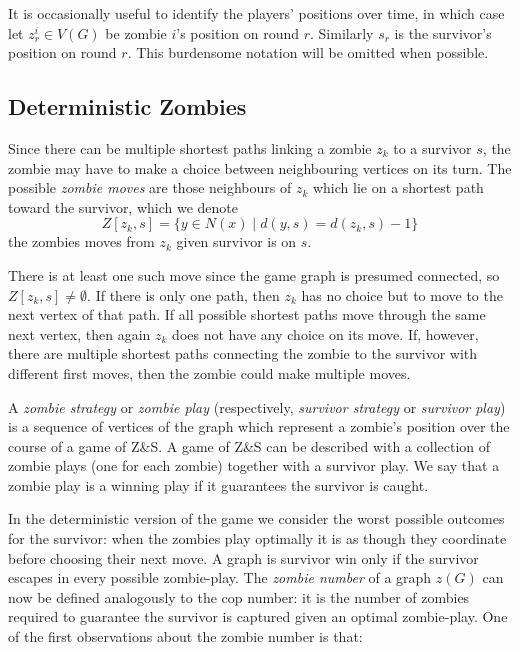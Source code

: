 It is occasionally useful to identify the players' positions over time, in which
case let $z_r^i \in V(G)$ be zombie $i$'s position on round $r$. Similarly $s_r$ is the
survivor's position on round $r$. This burdensome notation will be omitted when possible.

\subsection{Deterministic Zombies}\label{subsection intro deterministic}

Since there can be multiple shortest paths linking a zombie $z_k$ to a survivor $s$, the zombie may have to make a choice between neighbouring vertices on its turn. The possible \textit{zombie moves}
are those neighbours of $z_k$ which lie on a shortest path toward the survivor, which we denote
\[ Z[z_k, s] = \{ y \in N(x) \mid d(y, s) = d(z_k, s) - 1 \} \]
the zombies moves from $z_k$ given survivor is on $s$.

There is at least one such move since the game graph is presumed connected,
so $Z[z_k,s] \neq \emptyset$. If there is only one path, then $z_k$ has no choice but to move to the next vertex of that path. If all possible shortest paths move through the same next vertex, then again $z_k$ does not have any choice on its move. If, however, there are multiple shortest paths connecting the zombie to the survivor with different first moves, then the zombie could make multiple moves.

A \textit{zombie strategy} or \textit{zombie play} (respectively, \textit{survivor strategy} or \textit{survivor play}) is a sequence of vertices of the graph which represent a zombie's position over the course of a game of Z\&S. A game of Z\&S can be described with a collection of zombie plays (one for each zombie) together with a survivor play. We say that a zombie play is a winning play if it guarantees the survivor is caught.

In the deterministic version of the game we consider the worst possible outcomes for the survivor: when the zombies play optimally it is as though they coordinate before choosing their next move. A graph is survivor win only if the survivor escapes in every possible zombie-play.
The \textit{zombie number} of a graph $z(G)$ can now be defined analogously to the cop number: it is the number of zombies required to guarantee the survivor is captured given an optimal zombie-play.
One of the first observations \cite{fitzpatrick2016deterministic} about the zombie number is that:

